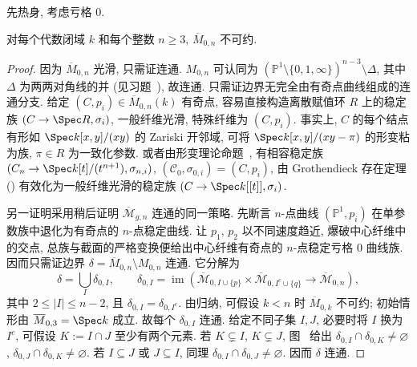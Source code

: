 先热身, 考虑亏格 $0$.
\begin{proposition}\label{src:6.7.23}
对每个代数闭域 $k$ 和每个整数 $n\geq3$, $\overline M_{0,\allowbreak n}$ 不可约.
\end{proposition}
\begin{proof}
因为 $\overline M_{0,\allowbreak n}$ 光滑, 只需证连通. $M_{0,\allowbreak n}$ 可认同为 $(\mathbb P^1\setminus\{0,\allowbreak 1,\allowbreak \infty\})^{n-3}\setminus\Delta$, 其中 $\Delta$ 为两两对角线的并 (见习题~), 故连通. 只需证边界无完全由有奇点曲线组成的连通分支. 给定 $(C,\allowbreak p_i)\in\overline M_{0,\allowbreak n}(k)$ 有奇点, 容易直接构造离散赋值环 $R$ 上的稳定族 $(\mathcal C\to\Spec R,\allowbreak \sigma_i)$, 一般纤维光滑, 特殊纤维为 $(C,\allowbreak p_i)$. 事实上, $C$ 的每个结点有形如 $\Spec k[x,\allowbreak y]/(xy)$ 的 Zariski 开邻域, 可将 $\Spec k[x,\allowbreak y]/(xy-\pi)$ 的形变粘为族, $\pi\in R$ 为一致化参数. 或者由形变理论命题~, 有相容稳定族 $(\mathcal C_n\to\Spec k[t]/(t^{n+1}),\allowbreak \sigma_{n,\allowbreak i})$, $(\mathcal C_0,\allowbreak \sigma_{0,\allowbreak i})=(C,\allowbreak p_i)$, 由 Grothendieck 存在定理 () 有效化为一般纤维光滑的稳定族 $(\mathcal C\to\Spec k[[t]],\allowbreak \sigma_i)$.

另一证明采用稍后证明 $\overline{\mathcal M}_{g,\allowbreak n}$ 连通的同一策略. 先断言 $n$-点曲线 $(\mathbb P^1,\allowbreak p_i)$ 在单参数族中退化为有奇点的 $n$-点稳定曲线. 让 $p_1$, $p_2$ 以不同速度趋近, 爆破中心纤维中的交点, 总族与截面的严格变换便给出中心纤维有奇点的 $n$-点稳定亏格 $0$ 曲线族. 因而只需证边界 $\delta=\overline M_{0,\allowbreak n}\setminus M_{0,\allowbreak n}$ 连通. 它分解为
\[
\delta=\bigcup_I\delta_{0,I},\qquad
\delta_{0,I}=\operatorname{im}(\overline{\mathcal M}_{0,I\cup\{p\}}\times\overline{\mathcal M}_{0,I^c\cup\{q\}}\to\overline{\mathcal M}_{0,n}),
\]
其中 $2\leq|I|\leq n-2$, 且 $\delta_{0,\allowbreak I}=\delta_{0,\allowbreak I^c}$. 由归纳, 可假设 $k<n$ 时 $\overline M_{0,\allowbreak k}$ 不可约; 初始情形由 $\overline M_{0,\allowbreak 3}=\Spec k$ 成立. 故每个 $\delta_{0,\allowbreak I}$ 连通. 给定不同子集 $I,\allowbreak J$, 必要时将 $I$ 换为 $I^c$, 可假设 $K:=I\cap J$ 至少有两个元素. 若 $K\subsetneq I$, $K\subsetneq J$, 图~ 给出 $\delta_{0,\allowbreak I}\cap\delta_{0,\allowbreak K}\ne\varnothing$, $\delta_{0,\allowbreak J}\cap\delta_{0,\allowbreak K}\ne\varnothing$. 若 $I\subseteq J$ 或 $J\subseteq I$, 同理 $\delta_{0,\allowbreak I}\cap\delta_{0,\allowbreak J}\ne\varnothing$. 因而 $\delta$ 连通.
\end{proof}
